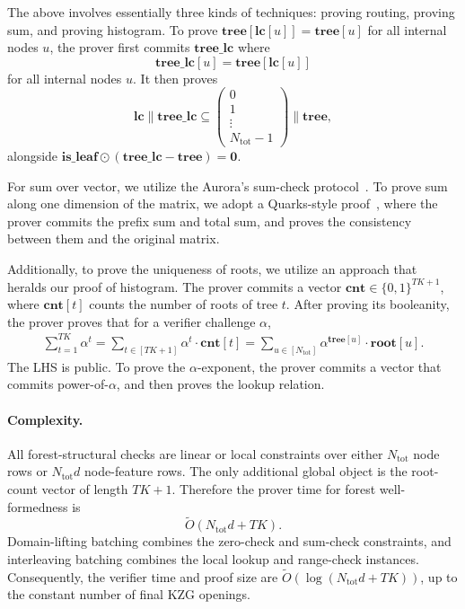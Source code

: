 The above involves essentially three kinds of techniques:
  proving routing, proving sum,
  and proving histogram.
  To prove $\mathbf{tree}[\mathbf{lc}[u]]=\mathbf{tree}[u]$ for all internal nodes $u$, the prover first
  commits $\mathbf{tree\_lc}$ where
  \[\mathbf{tree\_lc}[u] = \mathbf{tree}[\mathbf{lc}[u]]\]
  for all internal nodes $u$.
  It then proves
  \[
    \mathbf{lc}\|\mathbf{tree\_lc} \subseteq \left(\begin{matrix}
    0\\ 1\\ \vdots\\ N_{\mathrm{tot}}-1
    \end{matrix}\right)\|\mathbf{tree},
  \]
  alongside $\mathbf{is\_leaf}\odot(\mathbf{tree\_lc} - \mathbf{tree}) = \mathbf{0}$.

For sum over vector, we utilize the Aurora's sum-check protocol~\cite{aurora19}.
  To prove sum along one dimension of the matrix,
  we adopt a Quarks-style proof~\cite{quarks20},
  where the prover commits the prefix sum and total sum, 
  and proves the consistency between them and the original matrix.

Additionally, to prove the uniqueness of roots, we utilize
an approach that heralds our proof of histogram.
The prover commits a vector $\mathbf{cnt}\in \{0, 1\}^{TK+1}$, where $\mathbf{cnt}[t]$ counts the number of roots of tree $t$.
After proving its booleanity, the prover proves that
for a verifier challenge $\alpha$, 
\begin{align}
  \sum_{t=1}^{TK}\alpha^t = \sum_{t\in [TK+1]} \alpha^t\cdot \mathbf{cnt}[t] = \sum_{u\in [N_{\mathrm{tot}}]} \alpha^{\mathbf{tree}[u]}\cdot \mathbf{root}[u].
\end{align}
The LHS is public.
To prove the $\alpha$-exponent, the prover commits a vector
that commits power-of-$\alpha$, and then proves the lookup relation.

\paragraph{Complexity.}
All forest-structural checks are linear or local constraints over either
$N_{\mathrm{tot}}$ node rows or $N_{\mathrm{tot}}d$ node-feature rows. The
only additional global object is the root-count vector of length $TK+1$.
Therefore the prover time for forest well-formedness is
\[
    \tilde{O}(N_{\mathrm{tot}}d + TK).
\]
Domain-lifting batching combines the zero-check and sum-check constraints, and
interleaving batching combines the local lookup and range-check instances.
Consequently, the verifier time and proof size are
$\tilde{O}(\log(N_{\mathrm{tot}}d+TK))$, up to the constant number of final KZG
openings.

